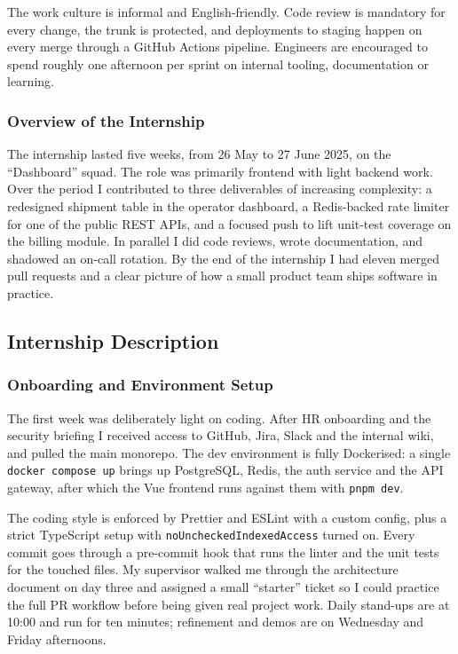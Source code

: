\documentclass[11pt,a4paper]{article}
\begin{document}
The work culture is informal and English-friendly. Code review is mandatory for every change, the trunk is protected, and deployments to staging happen on every merge through a GitHub Actions pipeline. Engineers are encouraged to spend roughly one afternoon per sprint on internal tooling, documentation or learning.

\subsubsection{Overview of the Internship}
The internship lasted five weeks, from 26 May to 27 June 2025, on the ``Dashboard'' squad. The role was primarily frontend with light backend work. Over the period I contributed to three deliverables of increasing complexity: a redesigned shipment table in the operator dashboard, a Redis-backed rate limiter for one of the public REST APIs, and a focused push to lift unit-test coverage on the billing module. In parallel I did code reviews, wrote documentation, and shadowed an on-call rotation. By the end of the internship I had eleven merged pull requests and a clear picture of how a small product team ships software in practice.

\subsection{Internship Description}

\subsubsection{Onboarding and Environment Setup}
The first week was deliberately light on coding. After HR onboarding and the security briefing I received access to GitHub, Jira, Slack and the internal wiki, and pulled the main monorepo. The dev environment is fully Dockerised: a single \texttt{docker compose up} brings up PostgreSQL, Redis, the auth service and the API gateway, after which the Vue frontend runs against them with \texttt{pnpm dev}.

The coding style is enforced by Prettier and ESLint with a custom config, plus a strict TypeScript setup with \texttt{noUncheckedIndexedAccess} turned on. Every commit goes through a pre-commit hook that runs the linter and the unit tests for the touched files. My supervisor walked me through the architecture document on day three and assigned a small ``starter'' ticket so I could practice the full PR workflow before being given real project work. Daily stand-ups are at 10:00 and run for ten minutes; refinement and demos are on Wednesday and Friday afternoons.
\end{document}
